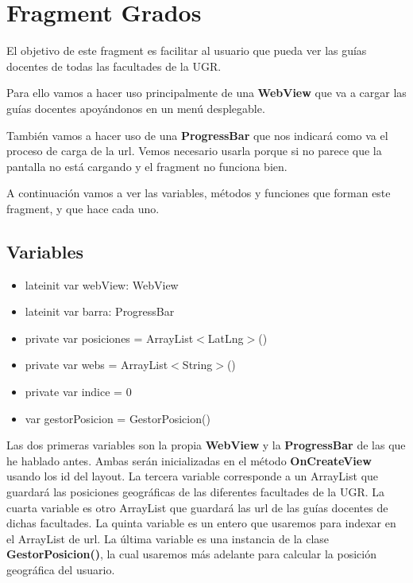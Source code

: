 \section{Fragment Grados}

El objetivo de este fragment es facilitar al usuario que pueda ver las guías docentes de todas las facultades de la UGR.

Para ello vamos a hacer uso principalmente de una \textbf{WebView} que va a cargar las guías docentes apoyándonos en un menú desplegable.

También vamos a hacer uso de una \textbf{ProgressBar} que nos indicará como va el proceso de carga de la url. Vemos necesario usarla porque si no parece que la pantalla no está cargando y el fragment no funciona bien.

A continuación vamos a ver las variables, métodos y funciones que forman este fragment, y que hace cada uno.

\subsection{Variables}

\begin{itemize}

\item{lateinit var webView: WebView}
\item{lateinit var barra: ProgressBar}
\item{private var posiciones = ArrayList$<$LatLng$>$()}
\item{private var webs = ArrayList$<$String$>$()}
\item{private var indice = 0}
\item{var gestorPosicion = GestorPosicion()}

\end{itemize}

Las dos primeras variables son la propia \textbf{WebView} y la \textbf{ProgressBar} de las que he hablado antes. Ambas serán inicializadas en el método \textbf{OnCreateView} usando los id del layout.
La tercera variable corresponde a un ArrayList que guardará las posiciones geográficas de las diferentes facultades de la UGR. La cuarta variable es otro ArrayList que guardará las url de las guías docentes de dichas facultades. La quinta variable es un entero que usaremos para indexar en el ArrayList de url. La última variable es una instancia de la clase \textbf{GestorPosicion()}, la cual usaremos más adelante para calcular la posición geográfica del usuario.


